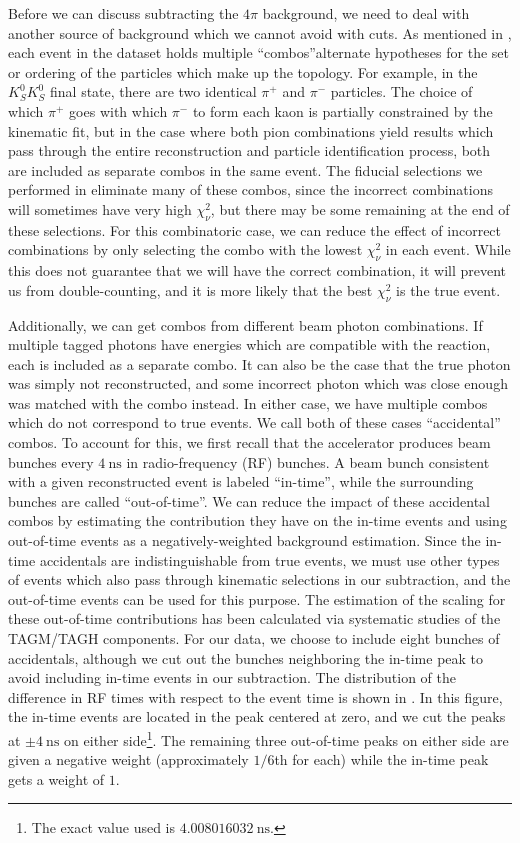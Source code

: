 Before we can discuss subtracting the $4\pi$ background, we need to deal with another source of background which we cannot avoid with cuts. As mentioned in , each event in the dataset holds multiple ``combos''\textemdash alternate hypotheses for the set or ordering of the particles which make up the topology. For example, in the $K_S^0K_S^0$ final state, there are two identical $\pi^+$ and $\pi^-$ particles. The choice of which $\pi^+$ goes with which $\pi^-$ to form each kaon is partially constrained by the kinematic fit, but in the case where both pion combinations yield results which pass through the entire reconstruction and particle identification process, both are included as separate combos in the same event. The fiducial selections we performed in  eliminate many of these combos, since the incorrect combinations will sometimes have very high $\chi^2_\nu$, but there may be some remaining at the end of these selections. For this combinatoric case, we can reduce the effect of incorrect combinations by only selecting the combo with the lowest $\chi^2_\nu$ in each event. While this does not guarantee that we will have the correct combination, it will prevent us from double-counting, and it is more likely that the best $\chi^2_\nu$ is the true event.

Additionally, we can get combos from different beam photon combinations. If multiple tagged photons have energies which are compatible with the reaction, each is included as a separate combo. It can also be the case that the true photon was simply not reconstructed, and some incorrect photon which was close enough was matched with the combo instead. In either case, we have multiple combos which do not correspond to true events. We call both of these cases ``accidental'' combos. To account for this, we first recall that the accelerator produces beam bunches every $\SI{4}{\nano\second}$ in radio-frequency (RF) bunches. A beam bunch consistent with a given reconstructed event is labeled ``in-time'', while the surrounding bunches are called ``out-of-time''. We can reduce the impact of these accidental combos by estimating the contribution they have on the in-time events and using out-of-time events as a negatively-weighted background estimation. Since the in-time accidentals are indistinguishable from true events, we must use other types of events which also pass through kinematic selections in our subtraction, and the out-of-time events can be used for this purpose. The estimation of the scaling for these out-of-time contributions has been calculated via systematic studies of the TAGM/TAGH components. For our data, we choose to include eight bunches of accidentals, although we cut out the bunches neighboring the in-time peak to avoid including in-time events in our subtraction. The distribution of the difference in RF times with respect to the event time is shown in . In this figure, the in-time events are located in the peak centered at zero, and we cut the peaks at $\pm \SI{4}{\nano\second}$ on either side\footnote{The exact value used is $\SI{4.008016032}{\nano\second}$.}. The remaining three out-of-time peaks on either side are given a negative weight (approximately $1/6$th for each) while the in-time peak gets a weight of $1$.

